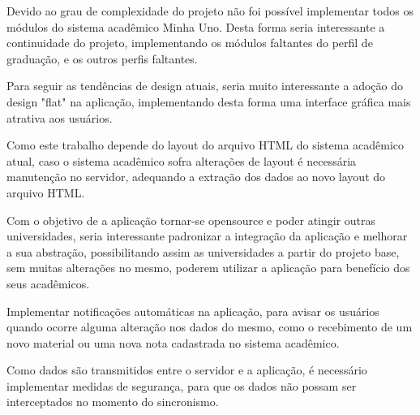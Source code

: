 Devido ao grau de complexidade do projeto não foi possível implementar todos os módulos do sistema acadêmico Minha Uno. Desta forma seria interessante a continuidade do projeto, implementando os módulos faltantes do perfil de graduação, e os outros perfis faltantes.

Para seguir as tendências de design atuais, seria muito interessante a adoção do design "flat" na aplicação, implementando desta forma uma interface gráfica mais atrativa aos usuários.

Como este trabalho depende do layout do arquivo HTML do sistema acadêmico atual, caso o sistema acadêmico sofra alterações de layout é necessária manutenção no servidor, adequando a extração dos dados ao novo layout do arquivo HTML.

Com o objetivo de a aplicação tornar-se opensource e poder atingir outras universidades, seria interessante padronizar a integração da aplicação e melhorar a sua abstração, possibilitando assim as universidades a partir do projeto base, sem muitas alterações no mesmo, poderem utilizar a aplicação para benefício dos seus acadêmicos.

Implementar notificações automáticas na aplicação, para avisar os usuários quando ocorre alguma alteração nos dados do mesmo, como o recebimento de um novo material ou uma nova nota cadastrada no sistema acadêmico.

Como dados são transmitidos entre o servidor e a aplicação, é necessário implementar medidas de segurança, para que os dados não possam ser interceptados no momento do sincronismo.